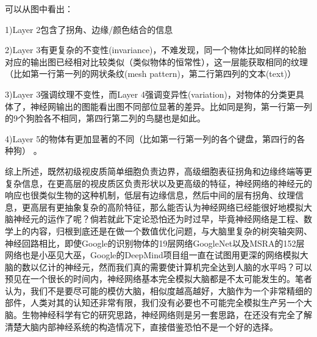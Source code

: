 \documentclass{article}
\begin{document}
\begin{spacing}{1.0}
	
	可以从图中看出：\par 
	1)Layer 2包含了拐角、边缘/颜色结合的信息\par 
	2)Layer 3有更复杂的不变性(invariance)，不难发现，同一个物体比如同样的轮胎对应的输出图已经相对比较类似（类似物体的恒常性），这一层能获取相同的纹理（比如第一行第一列的网状条纹(mesh pattern)，第二行第四列的文本(text)）\par 
	3)Layer 3强调纹理不变性，而Layer 4强调变异性(variation)，对物体的分类更具体了，神经网输出的图能看出图不同部位显著的差异。比如同是狗，第一行第一列的9个狗脸各不相同，第四行第二列的鸟腿也是如此。\par 
	4)Layer 5的物体有更加显著的不同（比如第一行第一列的各个键盘，第四行的各种狗） 。\par 
	综上所述，既然初级视皮质简单细胞负责边界，高级细胞表征拐角和边缘终端等更复杂信息，在更高层的视皮质区负责形状以及更高级的特征，神经网络的神经元的响应也很类似生物的这种机制，低层有边缘信息，然后中间的层有拐角、纹理信息，更高层有更抽象复杂的高阶特征，那么能否认为神经网络已经能很好地模拟大脑神经元的运作了呢？倘若就此下定论恐怕还为时过早，毕竟神经网络是工程、数学上的内容，归根到底还是在做一个数值优化问题，与大脑里复杂的树突轴突网、神经回路相比，即使Google的识别物体的19层网络GoogleNet以及MSRA的152层网络\cite{deep}也是小巫见大巫，Google的DeepMind项目组一直在试图用更深的网络模拟大脑的数以亿计的神经元，然而我们真的需要使计算机完全达到人脑的水平吗？可以预见在一个很长的时间内，神经网络基本完全模拟大脑都是不太可能发生的。笔者认为，我们不是要尽可能的模仿大脑，相似度越高越好，大脑作为一个非常精细的部件，人类对其的认知还非常有限，我们没有必要也不可能完全模拟生产另一个大脑。生物神经科学有它的研究思路，神经网络则是另一套思路，在还没有完全了解清楚大脑内部神经系统的构造情况下，直接借鉴恐怕不是一个好的选择。

\end{spacing}
\end{document}

